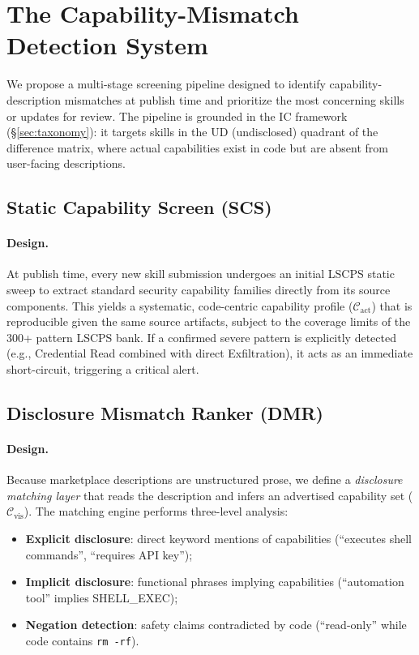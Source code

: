 
\section{The Capability-Mismatch Detection System}
\label{sec:detection}

We propose a multi-stage screening pipeline designed to identify capability-description mismatches at publish time and prioritize the most concerning skills or updates for review. The pipeline is grounded in the IC framework (\S\ref{sec:taxonomy}): it targets skills in the UD (undisclosed) quadrant of the difference matrix, where actual capabilities exist in code but are absent from user-facing descriptions.

\subsection{Static Capability Screen (SCS)}

\paragraph{Design.}
At publish time, every new skill submission undergoes an initial LSCPS
static sweep to extract standard security capability families directly
from its source components. This yields a systematic, code-centric
capability profile ($\mathcal{C}_{\text{act}}$) that is reproducible
given the same source artifacts, subject to the coverage limits of the
300+ pattern LSCPS bank. If a confirmed severe pattern is explicitly
detected (e.g., Credential Read combined with direct Exfiltration),
it acts as an immediate short-circuit, triggering a critical alert.

\subsection{Disclosure Mismatch Ranker (DMR)}

\paragraph{Design.}
Because marketplace descriptions are unstructured prose, we define a
\emph{disclosure matching layer} that reads the description and infers
an advertised capability set ($\mathcal{C}_{\text{vis}}$). The
matching engine performs three-level analysis:
\begin{itemize}
\item \textbf{Explicit disclosure}: direct keyword mentions of capabilities (``executes shell commands'', ``requires API key'');
\item \textbf{Implicit disclosure}: functional phrases implying capabilities (``automation tool'' implies SHELL\_EXEC);
\item \textbf{Negation detection}: safety claims contradicted by code (``read-only'' while code contains \texttt{rm -rf}).
\end{itemize}


